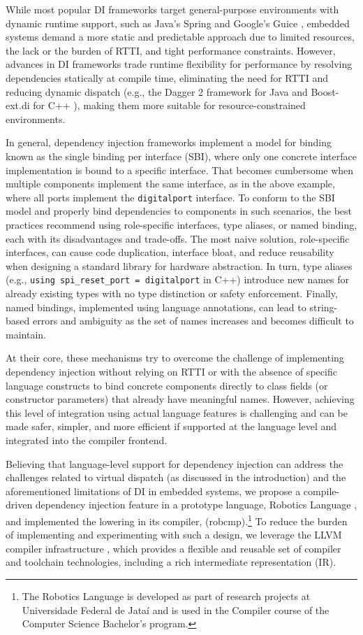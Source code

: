 \documentclass[10pt,sigplan,screen,anonymous]{acmart}
\newcommand{\blindreview}[1]{#1}
\begin{document}
While most popular DI frameworks target general-purpose environments with dynamic runtime support, such as Java's Spring \cite{fowler2004} and Google's Guice \cite{schaefer2008guice}, embedded systems demand a more static and predictable approach due to limited resources, the lack or the burden of RTTI, and tight performance constraints. However, advances in DI frameworks trade runtime flexibility for performance by resolving dependencies statically at compile time, eliminating the need for RTTI and reducing dynamic dispatch (e.g., the Dagger 2 framework \cite{dagger2} for Java and Boost-ext.di for C++ \cite{boostdi2018}), making them more suitable for resource-constrained environments.

In general, dependency injection frameworks implement a model for binding known as the single binding per interface (SBI), where only one concrete interface implementation is bound to a specific interface. That becomes cumbersome when multiple components implement the same interface, as in the above example, where all ports implement the {\tt digitalport} interface. To conform to the SBI model and properly bind dependencies to components in such scenarios, the best practices recommend using role-specific interfaces, type aliases, or named binding, each with its disadvantages and trade-offs. The most naive solution, role-specific interfaces, can cause code duplication, interface bloat, and reduce reusability when designing a standard library for hardware abstraction. In turn, type aliases (e.g., {\tt using spi\_reset\_port = digitalport} in C++) introduce new names for already existing types with no type distinction or safety enforcement. Finally, named bindings, implemented using language annotations, can lead to string-based errors and ambiguity as the set of names increases and becomes difficult to maintain.

At their core, these mechanisms try to overcome the challenge of implementing dependency injection without relying on RTTI or with the absence of specific language constructs to bind concrete components directly to class fields (or constructor parameters) that already have meaningful names. However, achieving this level of integration using actual language features is challenging and can be made safer, simpler, and more efficient if supported at the language level and integrated into the compiler frontend.

Believing that language-level support for dependency injection can address the challenges related to virtual dispatch (as discussed in the introduction) and the aforementioned limitations of DI in embedded systems, we propose a compile-driven dependency injection feature in a prototype language, \blindreview{Robotics Language \cite{robcmp}}, and implemented the lowering in its compiler, \blindreview{(robcmp).\footnote{The Robotics Language is developed as part of research projects at Universidade Federal de Jataí and is used in the Compiler course of the Computer Science Bachelor's program.}} To reduce the burden of implementing and experimenting with such a design, we leverage the LLVM compiler infrastructure \cite{lattner2004llvm}, which provides a flexible and reusable set of compiler and toolchain technologies, including a rich intermediate representation (IR).  
\end{document}
